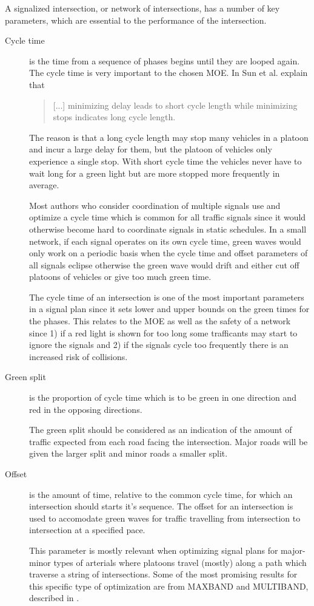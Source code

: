 A signalized intersection, or network of intersections, has a number of key parameters, which are essential to the performance of the intersection.

\begin{description}
\item[Cycle time] is the time from a sequence of phases begins until they are looped again. The cycle time is very important to the chosen MOE. In \cite{41} Sun et al. explain that 

\begin{quote}[...] minimizing delay leads to short cycle length while minimizing stops indicates long cycle length.
\end{quote}

The reason is that a long cycle length may stop many vehicles in a platoon and incur a large delay for them, but the platoon of vehicles only experience a single stop. With short cycle time the vehicles never have to wait long for a green light but are more stopped more frequently in average.

Most authors who consider coordination of multiple signals use and optimize a cycle time which is common for all traffic signals since it would otherwise become hard to coordinate signals in static schedules. In a small network, if each signal operates on its own cycle time, green waves would only work on a periodic basis when the cycle time and offset parameters of all signals eclipse otherwise the green wave would drift and either cut off platoons of vehicles or give too much green time.

The cycle time of an intersection is one of the most important parameters in a signal plan since it sets  lower and upper bounds on the green times for the phases. This relates to the MOE as well as the safety of a network since 1) if a red light is shown for too long some trafficants may start to ignore the signals and 2) if the signals cycle too frequently there is an increased risk of collisions.

\item[Green split]  is the proportion of cycle time which is to be green in one direction and red in the opposing directions. 

The green split should be considered as an indication of the amount of traffic expected from each road facing the intersection. Major roads will be given the larger split and minor roads a smaller split.

\item[Offset] is the amount of time, relative to the common cycle time, for which an intersection should starts it's sequence. The offset for an intersection is used to accomodate green waves for traffic travelling from intersection to intersection at a specified pace.

This parameter is mostly relevant when optimizing signal plans for major-minor types of arterials where platoons travel (mostly) along a path which traverse a string of intersections. Some of the most promising results for this specific type of optimization are from MAXBAND and MULTIBAND, described in \cite{37}.

\end{description}

